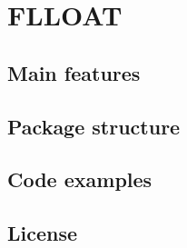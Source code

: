 \chapter{FLLOAT}

\section{Main features}
 
\section{Package structure}
 
\section{Code examples}
 
\section{License}
 